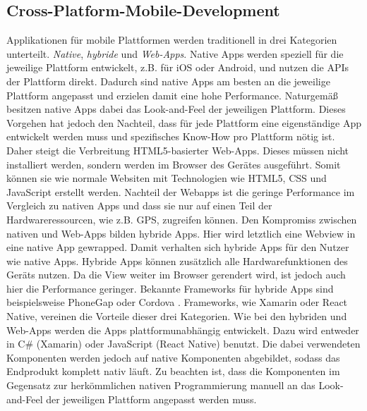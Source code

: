 % 


\subsection{Cross-Platform-Mobile-Development}
Applikationen für mobile Plattformen werden traditionell in drei Kategorien unterteilt. \textit{Native}, \textit{hybride} und \textit{Web-Apps}. Native Apps werden speziell für die jeweilige Plattform entwickelt, z.B. für iOS oder Android, und nutzen die APIs der Plattform direkt. Dadurch sind native Apps am besten an die jeweilige Plattform angepasst und erzielen damit eine hohe Performance. Naturgemäß besitzen native Apps  dabei das Look-and-Feel der jeweiligen Plattform. Dieses Vorgehen hat jedoch den Nachteil, dass für jede Plattform eine eigenständige App entwickelt werden muss und spezifisches Know-How pro Plattform nötig ist. Daher steigt die Verbreitung HTML5-basierter Web-Apps. Dieses müssen nicht installiert werden, sondern werden im Browser des Gerätes ausgeführt. Somit können sie wie normale Websiten mit Technologien wie HTML5, CSS und JavaScript erstellt werden. Nachteil der Webapps ist die geringe Performance im Vergleich zu nativen Apps und dass sie nur auf einen Teil der Hardwareressourcen, wie z.B. GPS, zugreifen können. Den Kompromiss zwischen nativen und Web-Apps bilden hybride Apps. Hier wird letztlich eine Webview in eine native App gewrapped. Damit verhalten sich hybride Apps für den Nutzer wie native Apps. Hybride Apps können zusätzlich alle Hardwarefunktionen des Geräts nutzen. Da die View weiter im Browser gerendert wird, ist jedoch auch hier die Performance geringer. Bekannte Frameworks für hybride Apps sind beispielsweise PhoneGap \cite{adobe_systems_inc._adobe_2016} oder Cordova \cite{the_apache_software_foundation_apache_2016}.
Frameworks, wie Xamarin \cite{xamarin_inc._xamarin_2016} oder React Native, vereinen die Vorteile dieser drei Kategorien. Wie bei den hybriden und Web-Apps werden die Apps plattformunabhängig entwickelt. Dazu wird entweder in C\# (Xamarin) oder JavaScript (React Native) benutzt. Die dabei verwendeten Komponenten werden jedoch auf native Komponenten abgebildet, sodass das Endprodukt komplett nativ läuft. Zu beachten ist, dass die Komponenten im Gegensatz zur herkömmlichen nativen Programmierung manuell an das Look-and-Feel der jeweiligen Plattform angepasst werden muss.